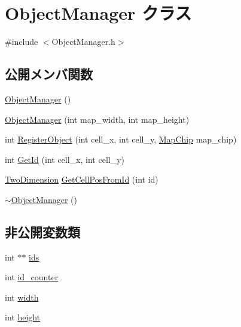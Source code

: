 \hypertarget{class_object_manager}{\section{Object\+Manager クラス}
\label{class_object_manager}
}


{\ttfamily \#include $<$Object\+Manager.\+h$>$}

\subsection*{公開メンバ関数}
\begin{DoxyCompactItemize}
\item 
\hyperlink{class_object_manager_a6fa9372c7c3a8da88412f4158ca3dfd9}{Object\+Manager} ()
\item 
\hyperlink{class_object_manager_a5e85ac955343ab559ece72451eaa57c1}{Object\+Manager} (int map\+\_\+width, int map\+\_\+height)
\item 
int \hyperlink{class_object_manager_afdf00874bff548b6d594d14b243241b3}{Register\+Object} (int cell\+\_\+x, int cell\+\_\+y, \hyperlink{_map_8h_ae7d76fffddf7fd7ef5d9466f971fc8e9}{Map\+Chip} map\+\_\+chip)
\item 
int \hyperlink{class_object_manager_a103f531d718ac57a39169f57d05a22cd}{Get\+Id} (int cell\+\_\+x, int cell\+\_\+y)
\item 
\hyperlink{struct_two_dimension}{Two\+Dimension} \hyperlink{class_object_manager_a89f072e56c22d2fafd15aff2c16df8dd}{Get\+Cell\+Pos\+From\+Id} (int id)
\item 
\hyperlink{class_object_manager_a25b057e6d1e60c9cbeb29d41923d8c2c}{$\sim$\+Object\+Manager} ()
\end{DoxyCompactItemize}
\subsection*{非公開変数類}
\begin{DoxyCompactItemize}
\item 
int $\ast$$\ast$ \hyperlink{class_object_manager_ae96857805143e168769f972f9b16bd09}{ids}
\item 
int \hyperlink{class_object_manager_a164a320ca3c3de4530536827d99a6458}{id\+\_\+counter}
\item 
int \hyperlink{class_object_manager_ae832dadf8bc59ae778c14c38065707aa}{width}
\item 
int \hyperlink{class_object_manager_a83650f15c75a9f0f0415966e15b2ad4f}{height}
\end{DoxyCompactItemize}


